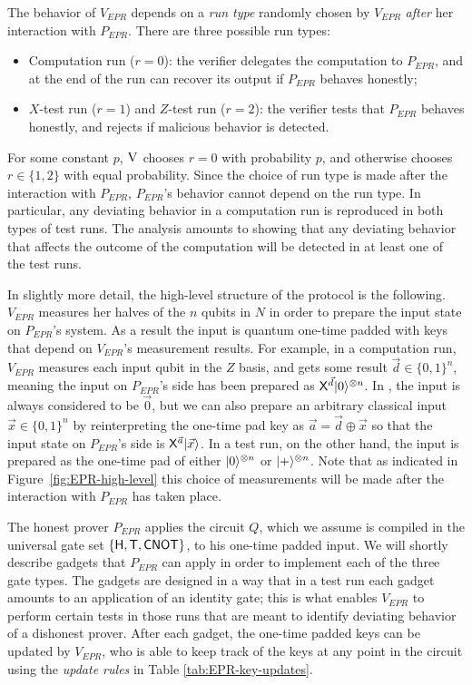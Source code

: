 The behavior of $V_{EPR}$ depends on a \emph{run type} randomly chosen by $V_{EPR}$ {\em after} her interaction with $P_{EPR}$. There are three possible run types:
\begin{itemize}[nolistsep]
\item Computation run ($r=0$): the verifier delegates the computation to $P_{EPR}$, and at the end of the run can recover its output if $P_{EPR}$ behaves honestly;
\item $X$-test run ($r=1$) and $Z$-test run ($r=2$): the verifier tests that  $P_{EPR}$  behaves honestly, and rejects if malicious behavior is detected.
\end{itemize}
For some constant $p$, $\textsc{V}$ chooses $r=0$ with probability $p$, and otherwise chooses $r\in\{1,2\}$ with equal probability. Since the choice of run type is made after the interaction with $P_{EPR}$, $P_{EPR}$'s behavior cannot depend on the run type. In particular, any deviating behavior in a computation run is reproduced in both types of test runs. The analysis amounts to showing that any deviating behavior that affects the outcome of the computation will be detected in at least one of the test runs. 

In slightly more detail, the high-level structure of the protocol is the following. $V_{EPR}$ measures her halves of the $n$ qubits in $N$ in order to prepare the input state on $P_{EPR}$'s system. As a result the input is quantum one-time padded with keys that depend on $V_{EPR}$'s measurement results. For example, in a computation run, $V_{EPR}$ measures each input qubit in the $Z$ basis, and gets some result $\vec{d}\in\{0,1\}^n$, meaning the input on $P_{EPR}$'s side has been prepared as ${\sf X}^{\vec{d}}|0\rangle^{\otimes n}$. In \cite{broadbent15howtoverify}, the input is always considered to be $\vec{0}$, but we can also prepare an arbitrary classical input $\vec{x}\in\{0,1\}^n$ by reinterpreting the one-time pad key as $\vec{a}=\vec{d}\oplus \vec{x}$ so that the input state on $P_{EPR}$'s side is ${\sf X}^{\vec{a}}|\vec{x}\rangle$. In a test run, on the other hand, the input is prepared as the one-time pad of either $|0\rangle^{\otimes n}$ or $|+\rangle^{\otimes n}$. Note that as indicated in Figure~\ref{fig:EPR-high-level} this choice of measurements will be made after the interaction with $P_{EPR}$ has taken place.

The honest prover $P_{EPR}$ applies the circuit $Q$, which we assume is compiled in the universal gate set $\{{\sf H},{\sf T},{\sf CNOT}\}$, to his one-time padded input. We will shortly describe gadgets that $P_{EPR}$ can apply in order to implement each of the three gate types. The gadgets are designed in a way that in a test run each gadget amounts to an application of an identity gate; this is what enables $V_{EPR}$ to perform certain tests in those runs that are meant to identify deviating behavior of a dishonest prover. After each gadget, the one-time padded keys can be updated by $V_{EPR}$, who is able to keep track of the keys at any point in the circuit using the \emph{update rules} in Table \ref{tab:EPR-key-updates}. 


